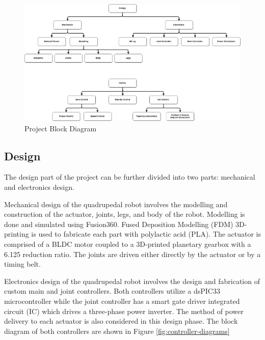 \documentclass[english]{upeeei}
\begin{document}
\begin{figure}[H]
\begin{centering}
\includegraphics[width=1.0\columnwidth]{images/project_block_diagram}
\par\end{centering}
\caption{Project Block Diagram\label{fig:project-block-diagram}}
\end{figure}

\subsection{Design}

The design part of the project can be further divided into two parts: mechanical and electronics design. 

Mechanical design of the quadrupedal robot involves the modelling and construction of the actuator, joints, legs, and body of the robot. Modelling is done and simulated using Fusion360. Fused Deposition Modelling (FDM) 3D-printing is used to fabricate each part with polylactic acid (PLA). The actuator is comprised of a BLDC motor coupled to a 3D-printed planetary gearbox with a 6.125 reduction ratio. The joints are driven either directly by the actuator or by a timing belt.

Electronics design of the quadrupedal robot involves the design and fabrication of custom main and joint controllers. Both controllers utilize a dsPIC33 microcontroller while the joint controller has a smart gate driver integrated circuit (IC) which drives a three-phase power inverter. The method of power delivery to each actuator is also considered in this design phase. The block diagram of both controllers are shown in Figure \ref{fig:controller-diagrams}
\end{document}
